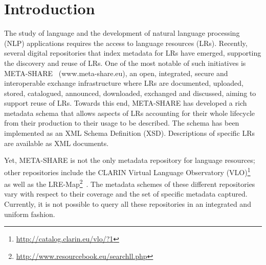 \documentclass{llncs}
\begin{document}
\section{Introduction}
\label{sec:introduction}
The study of language and the development of natural language processing (NLP) applications requires the access to language resources (LRs). %
Recently, several digital repositories that index metadata for LRs have emerged,
supporting the discovery and reuse of LRs. One of the most notable of such
initiatives is META-SHARE~\cite{piperidis2012meta} (www.meta-share.eu), an open,
integrated, secure and interoperable exchange infrastructure where LRs are
documented, uploaded, stored, catalogued, announced, downloaded, exchanged and
discussed, aiming to support reuse of LRs. Towards this end, META-SHARE has
developed a rich metadata schema that allows aspects of LRs accounting for their
whole lifecycle from their production to their usage to be described. The schema has been implemented as an XML Schema Definition (XSD). Descriptions of specific LRs are available as XML documents.

Yet, META-SHARE is not the only metadata repository for language resources;
other repositories include the CLARIN Virtual Language Observatory
(VLO)\footnote{\url{http://catalog.clarin.eu/vlo/?1}}~\cite{broeder2010data} as
well as the LRE-Map\footnote{\url{http://www.resourcebook.eu/searchll.php}}~\cite{calzolari2012lre}. The metadata schemes of these different repositories vary with respect to their coverage and the set of specific metadata captured.
Currently, it is not possible to query all these repositories in an integrated and uniform fashion.
\end{document}
